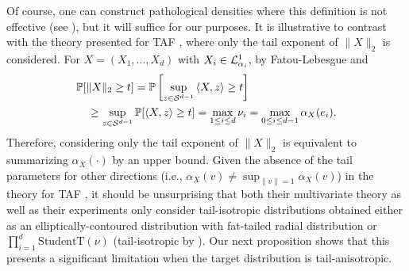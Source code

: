 \documentclass[thesis.tex]{subfiles}
\begin{document}
Of course, one can construct pathological densities where this definition is not effective
(see ), but it will suffice for our purposes. 
It is illustrative to contrast with the theory presented for TAF \citep{jaini2020tails},
where only the tail exponent of $\|X\|_2$ is considered.
For $X = (X_1, \ldots, X_d)$ with $X_i \in \mathcal{L}^1_{\alpha_i}$, 
by Fatou-Lebesgue and 
\begin{align*}
  &\mathbb{P}[\|X\|_2 \geq t]
  = \mathbb{P}\left[\sup_{z \in {\mathcal{S}}^{d-1}} \braket{X,z} \geq t\right]\\
  &\quad \geq \sup_{z \in {\mathcal{S}}^{d-1}} \mathbb{P}[\braket{X,z} \geq t]
  = \max_{1 \leq i \leq d} \nu_i
  = \max_{0 \leq i \leq d-1} \alpha_X(e_i) .
\end{align*}
Therefore, considering only the tail exponent of $\|X\|_2$ is equivalent to summarizing $\alpha_X(\cdot)$ by an upper bound.
Given the absence of the tail parameters for other directions (i.e., $\alpha_X(v) \neq \sup_{\|v\|=1} \alpha_X(v)$)
in the theory for TAF \citep{jaini2020tails}, it should be unsurprising that both their multivariate 
theory as well as their experiments only consider tail-isotropic distributions obtained either
as an elliptically-contoured distribution with fat-tailed radial distribution or 
$\prod_{i=1}^d \text{StudentT}(\nu)$ (tail-isotropic by ). 
Our next proposition shows that this presents a significant limitation when the target distribution is
tail-anisotropic.




\end{document}
